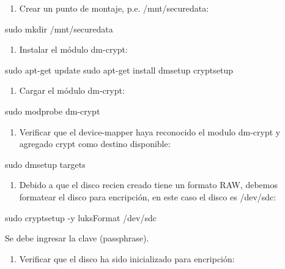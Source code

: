 \begin{enumerate}
\item Crear un punto de montaje, p.e. /mnt/securedata:
\end{enumerate}

\begin{SourceCode}
sudo mkdir /mnt/securedata
\end{SourceCode}

\begin{enumerate}
\item Instalar el módulo dm-crypt:
\end{enumerate}

\begin{SourceCode}
sudo apt-get update
sudo apt-get install dmsetup cryptsetup
\end{SourceCode}

\begin{enumerate}
\item Cargar el módulo dm-crypt:
\end{enumerate}

\begin{SourceCode}
sudo modprobe dm-crypt
\end{SourceCode}

\begin{enumerate}
\item Verificar que el device-mapper haya reconocido el modulo dm-crypt y agregado crypt como destino disponible:
\end{enumerate}

\begin{SourceCode}
sudo dmsetup targets
\end{SourceCode}

\begin{enumerate}
\item Debido a que el disco recien creado tiene un formato RAW, debemos formatear el disco para encripción, en este caso el disco es /dev/sdc:
\end{enumerate}

\begin{SourceCode}
sudo cryptsetup -y luksFormat /dev/sdc
\end{SourceCode}

Se debe ingresar la clave (passphrase).

\begin{enumerate}
\item Verificar que el disco ha sido inicializado para encripción:
\end{enumerate}

